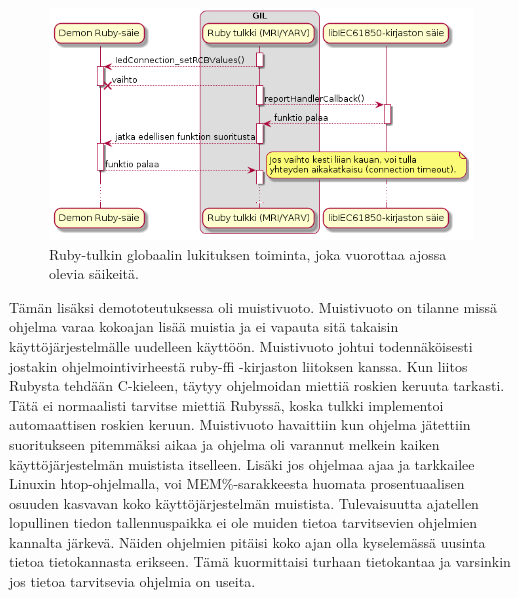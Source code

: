 \begin{figure}[ht!]
	\includegraphics[width=1\textwidth]{pictures/ruby-gil.png}
	\caption{Ruby-tulkin globaalin lukituksen toiminta, joka vuorottaa ajossa olevia säikeitä.}
	\label{fig:ruby-gil}
\end{figure}

Tämän lisäksi demototeutuksessa oli muistivuoto. Muistivuoto on tilanne missä ohjelma varaa kokoajan lisää muistia ja ei vapauta sitä takaisin käyttöjärjestelmälle uudelleen käyttöön. Muistivuoto johtui todennäköisesti jostakin ohjelmointivirheestä ruby-ffi -kirjaston liitoksen kanssa. Kun liitos Rubysta tehdään C-kieleen, täytyy ohjelmoidan miettiä roskien keruuta tarkasti. Tätä ei normaalisti tarvitse miettiä Rubyssä, koska tulkki implementoi automaattisen roskien keruun. Muistivuoto havaittiin kun ohjelma jätettiin suoritukseen pitemmäksi aikaa ja ohjelma oli varannut melkein kaiken käyttöjärjestelmän muistista itselleen. Lisäki jos ohjelmaa ajaa ja tarkkailee Linuxin htop-ohjelmalla, voi MEM\%-sarakkeesta huomata prosentuaalisen osuuden kasvavan koko käyttöjärjestelmän muistista. Tulevaisuutta ajatellen lopullinen tiedon tallennuspaikka ei ole muiden tietoa tarvitsevien ohjelmien kannalta järkevä. Näiden ohjelmien pitäisi koko ajan olla kyselemässä uusinta tietoa tietokannasta erikseen. Tämä kuormittaisi turhaan tietokantaa ja varsinkin jos tietoa tarvitsevia ohjelmia on useita.